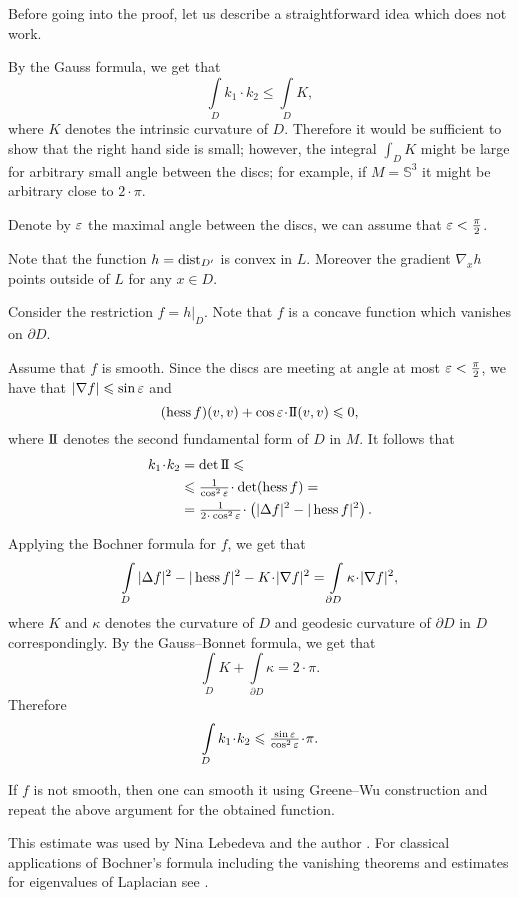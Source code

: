 
Before going into the proof, let us describe a straightforward idea which does not work.

By the Gauss formula, we get that 
\[\int\limits_{D}k_1\cdot k_2\le\int\limits_{D}K,\] 
where $K$ denotes the intrinsic curvature of $D$.
Therefore it would be sufficient to show that the right hand side is small;
however, the integral $\int_{D}K$ might be large for arbitrary small angle between the discs; for example, if $M=\mathbb{S}^3$ it might be arbitrary close to $2\cdot \pi$.

\medskip

Denote by $\varepsilon$ the maximal angle between the discs, we can assume that $\varepsilon<\tfrac\pi2$.

Note that the function $h=\operatorname{\rm dist}\nolimits_{D'}$ is convex in $L$.
Moreover the gradient $\nabla_xh$ points outside of $L$ for any $x\in D$. 

Consider the restriction $f=h|_D$.
Note that $f$ is a concave function which vanishes on $\partial D$.

Assume that $f$ is smooth.
Since the discs are meeting at angle at most $\varepsilon<\tfrac\pi2$,
we have that $|\nabla f|\leqslant \sin\varepsilon$ and 
\[(\Hess f)(v,v)+ \cos\eps \cdot \2(v,v)\le 0,\]
where $\mathrm{I{\hskip-.1em}I}$ denotes the second fundamental form of $D$ in $M$.
It follows that
\begin{align*}
k_1\cdot k_2&=\det \2\le
\\
&\le \tfrac1{\cos^2\eps}\cdot \det(\Hess f)=
\\
&=\tfrac1{2\cdot\cos^2\eps}\cdot\left(|\Delta f|^2
-|\Hess f|^2\right).
\end{align*}


Applying the Bochner formula for $f$, we get that
\[\int\limits_D |\Delta f|^2
-|\Hess f|^2
-K\cdot|\nabla f|^2
=\int\limits_{\partial D}
\kappa\cdot|\nabla f|^2,\]
where $K$ and $\kappa$ denotes the curvature of $D$ and geodesic curvature of $\partial D$ in $D$ correspondingly.
By the Gauss--Bonnet formula, we get that
\[\int\limits_D 
K+\int\limits_{\partial D}\kappa=2\cdot\pi.\]
Therefore
\[\int\limits_Dk_1\cdot k_2\le \tfrac{\sin \eps}{\cos^2\eps}\cdot\pi.\]

If $f$ is not smooth, then one can smooth it using Greene--Wu construction \cite[Theorem~2]{greene-wu} and repeat the above argument for the obtained function.
\qedsf

This estimate was used by Nina Lebedeva and the author \cite{lebedeva-petrunin-curvature}.
For classical applications of Bochner's formula including the vanishing theorems and estimates for eigenvalues of Laplacian see \cite[][II \S 8 in]{lawson-michelsohn}.
